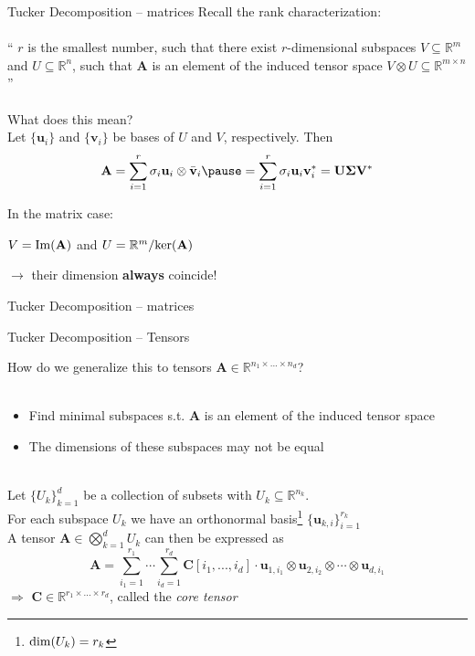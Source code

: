\documentclass{beamer}
\newcommand{\bgk}[1]{\boldsymbol{#1}}
\newcommand{\bSigma}{\bgk{\Sigma}}
\newcommand{\bvec}[1]{\mathbf{#1}}
\newcommand{\vu}{\bvec{u}}
\newcommand{\vv}{\bvec{v}}
\newcommand{\vA}{\bvec{A}}
\newcommand{\vC}{\bvec{C}}
\newcommand{\vU}{\bvec{U}}
\newcommand{\vV}{\bvec{V}}
\newcommand{\bitem}{\item[$\bullet$]}
\begin{document}
\begin{frame}{Tucker Decomposition -- matrices}
Recall the rank characterization:\\
~\\
    ``
    $r$ is the smallest number, such that there exist $r$-dimensional subspaces $V \subseteq \mathbb{R}^m$ and $U \subseteq \mathbb{R}^n$, such that $\vA$ is an element of the induced tensor space $V \otimes U \subseteq \mathbb{R}^{m\times n}$
    ''\\
\pause
~\\
What does this mean?\\
Let $\{\vu_i\}$ and $\{\vv_i\}$ be bases of $U$ and $V$, respectively.
\pause
Then
\begin{equation*}
\vA 
=
\sum_{i=1}^r
\sigma_i \vu_i \otimes \bar{\vv}_i
\pause
=
\sum_{i=1}^r
\sigma_i \vu_i \vv_i^*
=
\vU \bSigma \vV^*
\end{equation*}

In the matrix case:\\
\begin{center}
 $V = {\rm Im}(\vA)$ and $U = \mathbb{R}^m/ {\rm ker}(\vA)$ \\
\end{center}
$\rightarrow$ their dimension {\bf always} coincide!
\end{frame}

\begin{frame}{Tucker Decomposition -- matrices}
    
\end{frame}

\begin{frame}{Tucker Decomposition -- Tensors}

How do we generalize this to tensors $\vA \in \mathbb{R}^{n_1\times ... \times n_d}$?\\
~\\
\begin{itemize}
    \bitem Find minimal subspaces s.t. $\vA$ is an element of the induced tensor space
    \bitem The dimensions of these subspaces may not be equal
\end{itemize}
~\\
\pause
Let $\{U_k\}_{k=1}^d$ be a collection of subsets with $U_k\subseteq \mathbb{R}^{n_k}$. \\
\pause
For each subspace $U_k$ we have an orthonormal basis\footnote{${\rm dim}(U_k) = r_k$} $\{\vu_{k,i}\}_{i=1}^{r_k}$ \\
A tensor $\vA \in \bigotimes_{k=1}^d U_k$ can then be expressed as
$$
\vA = \sum_{i_1  = 1}^{r_1} \cdots \sum_{i_d  = 1}^{r_d}
\vC[i_1,...,i_d] \cdot \vu_{1,i_1}\otimes \vu_{2,i_2}\otimes \cdots \otimes \vu_{d,i_1}
$$
\pause
$\Rightarrow$ $\vC \in \mathbb{R}^{r_1 \times ... \times r_d}$, called the {\it core tensor}

\end{frame}
\end{document}

